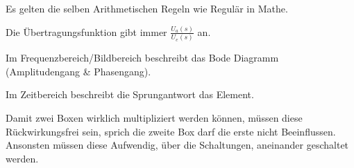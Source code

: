 \documentclass[letterpaper,10pt,english]{jupyterBook}
\begin{document}
\sphinxAtStartPar
Es gelten die selben Arithmetischen Regeln wie Regulär in Mathe.

\sphinxAtStartPar
Die Übertragungsfunktion gibt immer \(\frac{U_a(s)}{U_e(s)}\) an.

\begin{DUlineblock}{0em}
\item[] 
\end{DUlineblock}

\sphinxAtStartPar
Im Frequenzbereich/Bildbereich beschreibt das Bode Diagramm (Amplitudengang \& Phasengang).

\sphinxAtStartPar
Im Zeitbereich beschreibt die Sprungantwort das Element.

\begin{DUlineblock}{0em}
\item[] 
\end{DUlineblock}

\sphinxAtStartPar
Damit zwei Boxen wirklich multipliziert werden können, müssen diese Rückwirkungsfrei sein,
sprich die zweite Box darf die erste nicht Beeinflussen.
Ansonsten müssen diese Aufwendig, über die Schaltungen, aneinander geschaltet werden.
\end{document}
